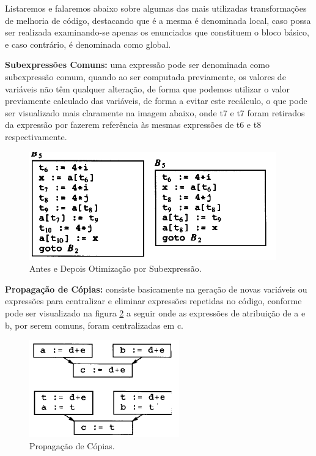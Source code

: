 \documentclass[12pt]{article}
\begin{document}
Listaremos e falaremos abaixo sobre algumas das mais utilizadas transformações de melhoria de código, destacando que é a mesma é denominada local, caso possa ser realizada examinando-se apenas os enunciados que constituem o bloco básico, e caso contrário, é denominada como global.

\textbf{Subexpressões Comuns:} uma expressão pode ser denominada como subexpressão comum, quando ao ser computada previamente, os valores de variáveis não têm qualquer alteração, de forma que podemos utilizar o valor previamente calculado das variáveis, de forma a evitar este recálculo, o que pode ser visualizado mais claramente na imagem abaixo, onde t7 e t7 foram retirados da expressão por fazerem referência às mesmas expressões de t6 e t8 respectivamente.

\begin{figure}[!htb]
    \centering
    \includegraphics[scale=0.9]{Imagens/comp_1.png}
    \centering
    \caption{Antes e Depois Otimização por Subexpressão.}
    \label{subexpressao}
\end{figure}

\textbf{Propagação de Cópias:} consiste basicamente na geração de novas variáveis ou expressões para centralizar e eliminar expressões repetidas no código, conforme pode ser visualizado na figura \ref{propagacao} a seguir onde as expressões de atribuição de a e b, por serem comuns, foram centralizadas em c. 

\begin{figure}[!htb]
    \centering
    \includegraphics[scale=0.9]{Imagens/comp_2.png}
    \centering
    \caption{Propagação de Cópias.}
    \label{propagacao}
\end{figure}
\end{document}

